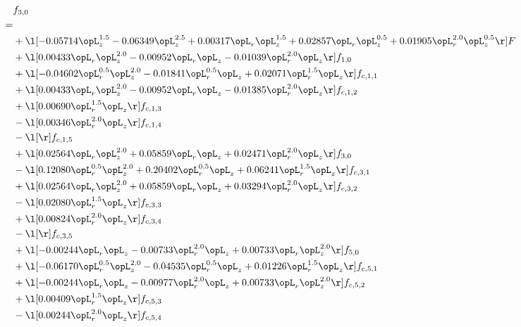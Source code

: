 \begin{alignat}{2} 
\label{eq:f_30_1} 
& f_{3,0} \nonumber \\ 
 = \\ 
& + \l[  -0.05714 \opL_z^{1.5}   -0.06349 \opL_z^{2.5} +  0.00317 \opL_r \opL_z^{1.5} +  0.02857 \opL_r \opL_z^{0.5} +  0.01905 \opL_r^{2.0} \opL_z^{0.5}  \r] F \nonumber \\ 
& + \l[  0.00433 \opL_r \opL_z^{2.0}   -0.00952 \opL_r \opL_z   -0.01039 \opL_r^{2.0} \opL_z  \r] f_{1,0} \nonumber \\ 
& + \l[  -0.04602 \opL_r^{0.5} \opL_z^{2.0}   -0.01841 \opL_r^{0.5} \opL_z +  0.02071 \opL_r^{1.5} \opL_z  \r] f_{c,1,1} \nonumber \\ 
& + \l[  0.00433 \opL_r \opL_z^{2.0}   -0.00952 \opL_r \opL_z   -0.01385 \opL_r^{2.0} \opL_z  \r] f_{c,1,2} \nonumber \\ 
& + \l[  0.00690 \opL_r^{1.5} \opL_z  \r] f_{c,1,3} \nonumber \\ 
& - \l[  0.00346 \opL_r^{2.0} \opL_z  \r] f_{c,1,4} \nonumber \\ 
& - \l[  \r] f_{c,1,5} \nonumber \\ 
& + \l[  0.02564 \opL_r \opL_z^{2.0} +  0.05859 \opL_r \opL_z +  0.02471 \opL_r^{2.0} \opL_z  \r] f_{3,0} \nonumber \\ 
& - \l[  0.12080 \opL_r^{0.5} \opL_z^{2.0} +  0.20402 \opL_r^{0.5} \opL_z +  0.06241 \opL_r^{1.5} \opL_z  \r] f_{c,3,1} \nonumber \\ 
& + \l[  0.02564 \opL_r \opL_z^{2.0} +  0.05859 \opL_r \opL_z +  0.03294 \opL_r^{2.0} \opL_z  \r] f_{c,3,2} \nonumber \\ 
& - \l[  0.02080 \opL_r^{1.5} \opL_z  \r] f_{c,3,3} \nonumber \\ 
& + \l[  0.00824 \opL_r^{2.0} \opL_z  \r] f_{c,3,4} \nonumber \\ 
& - \l[  \r] f_{c,3,5} \nonumber \\ 
& + \l[  -0.00244 \opL_r \opL_z   -0.00733 \opL_r^{2.0} \opL_z +  0.00733 \opL_r \opL_z^{2.0}  \r] f_{5,0} \nonumber \\ 
& + \l[  -0.06170 \opL_r^{0.5} \opL_z^{2.0}   -0.04535 \opL_r^{0.5} \opL_z +  0.01226 \opL_r^{1.5} \opL_z  \r] f_{c,5,1} \nonumber \\ 
& + \l[  -0.00244 \opL_r \opL_z   -0.00977 \opL_r^{2.0} \opL_z +  0.00733 \opL_r \opL_z^{2.0}  \r] f_{c,5,2} \nonumber \\ 
& + \l[  0.00409 \opL_r^{1.5} \opL_z  \r] f_{c,5,3} \nonumber \\ 
& - \l[  0.00244 \opL_r^{2.0} \opL_z  \r] f_{c,5,4} \nonumber \\ 

\end{alignat}
